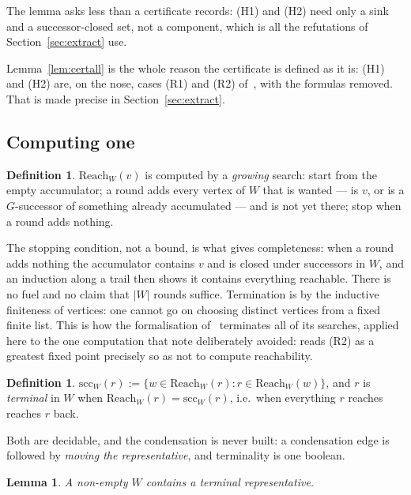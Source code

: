 \documentclass[11pt,a4paper]{article}
\newtheorem{lemma}[theorem]{Lemma}
\theoremstyle{definition}
\newtheorem{definition}[theorem]{Definition}
\newcommand{\Reach}{\mathrm{Reach}}
\begin{document}
The lemma asks less than a certificate records: (H1) and (H2) need only a sink
and a successor-closed set, not a component, which is all the refutations of
Section~\ref{sec:extract} use.

Lemma~\ref{lem:certall} is the whole reason the certificate is defined as it
is: (H1) and (H2) are, on the nose, cases (R1) and (R2)
of~\cite[Def.~3.1]{m4}, with the formulas removed.  That is made precise in
Section~\ref{sec:extract}.

\subsection*{Computing one}

\begin{definition}\label{def:reach}
$\Reach_W(v)$ is computed by a \emph{growing} search: start from the empty
accumulator; a round adds every vertex of $W$ that is wanted --- is $v$, or is
a $G$-successor of something already accumulated --- and is not yet there; stop
when a round adds nothing.
\end{definition}

The stopping condition, not a bound, is what gives completeness: when a round
adds nothing the accumulator contains $v$ and is closed under successors in
$W$, and an induction along a trail then shows it contains everything reachable.
There is no fuel and no claim that $|W|$ rounds suffice.  Termination is by the
inductive finiteness of vertices: one cannot go on choosing distinct vertices
from a fixed finite list.  This is how the formalisation of~\cite{m4}
terminates all of its searches, applied here to the one computation that note
deliberately avoided: \cite[Rem.~3.2]{m4} reads (R2) as a greatest fixed point
precisely so as not to compute reachability.

\begin{definition}\label{def:scc}
$\mathrm{scc}_W(r):=\{w\in\Reach_W(r): r\in\Reach_W(w)\}$, and $r$ is
\emph{terminal} in $W$ when $\Reach_W(r)=\mathrm{scc}_W(r)$, i.e.\ when
everything $r$ reaches reaches $r$ back.
\end{definition}

Both are decidable, and the condensation is never built: a condensation edge is
followed by \emph{moving the representative}, and terminality is one boolean.

\begin{lemma}\label{lem:findterm}
A non-empty $W$ contains a terminal representative.
\end{lemma}
\end{document}

